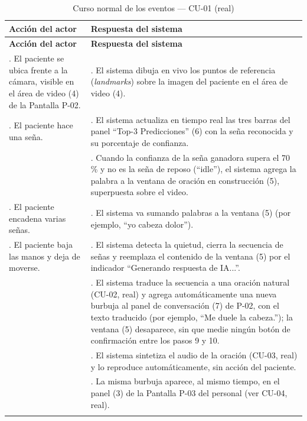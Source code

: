 \setlength{\extrarowheight}{5pt}
\begin{longtable}{@{}>{\raggedright\arraybackslash}p{} >{\raggedright\arraybackslash}p{}@{}}
\toprule
\textbf{Acción del actor} & \textbf{Respuesta del sistema} \\
\midrule
\endfirsthead
\toprule
\textbf{Acción del actor} & \textbf{Respuesta del sistema} \\
\midrule
\endhead
1. El paciente se ubica frente a la cámara, visible en el área de video
(4) de la Pantalla P-02. &
2. El sistema dibuja en vivo los puntos de referencia (\textit{landmarks})
sobre la imagen del paciente en el área de video (4). \\
3. El paciente hace una seña. &
4. El sistema actualiza en tiempo real las tres barras del panel
``Top-3 Predicciones'' (6) con la seña reconocida y su porcentaje de
confianza. \\
&
5. Cuando la confianza de la seña ganadora supera el 70\,\% y no es la
seña de reposo (``idle''), el sistema agrega la palabra a la ventana de
oración en construcción (5), superpuesta sobre el video. \\
6. El paciente encadena varias señas. &
7. El sistema va sumando palabras a la ventana (5) (por ejemplo, ``yo
cabeza dolor''). \\
8. El paciente baja las manos y deja de moverse. &
9. El sistema detecta la quietud, cierra la secuencia de señas y
reemplaza el contenido de la ventana (5) por el indicador ``Generando
respuesta de IA...''. \\
&
10. El sistema traduce la secuencia a una oración natural (CU-02, real) y
agrega automáticamente una nueva burbuja al panel de conversación (7) de
P-02, con el texto traducido (por ejemplo, ``Me duele la cabeza.''); la
ventana (5) desaparece, sin que medie ningún botón de confirmación entre
los pasos 9 y 10. \\
&
11. El sistema sintetiza el audio de la oración (CU-03, real) y lo
reproduce automáticamente, sin acción del paciente. \\
&
12. La misma burbuja aparece, al mismo tiempo, en el panel (3) de la
Pantalla P-03 del personal (ver CU-04, real). \\
\bottomrule
\caption{Curso normal de los eventos --- CU-01 (real)}
\end{longtable}
\setlength{\extrarowheight}{0pt}

